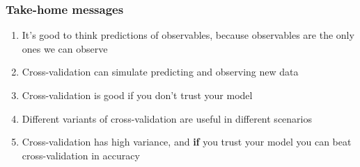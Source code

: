 \documentclass[10pt]{beamer}
\begin{document}
\begin{frame}{}

\frametitle{Take-home messages}

  \begin{enumerate}
  \item It's good to think predictions of observables, because
    observables are the only ones we can observe
  \item {}Cross-validation can simulate predicting and observing new
    data
  \item {}Cross-validation is good if you don't
    trust your model
  \item {}Different variants of cross-validation
    are useful in different scenarios
  \item {}Cross-validation has high variance, and
    {\bf if} you trust your model you can beat cross-validation in
    accuracy
  \end{enumerate}

\end{frame}



\end{document}
